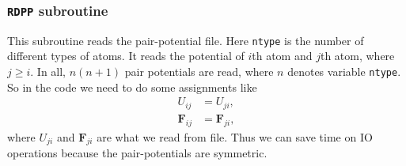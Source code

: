 
\subsubsection{\texttt{RDPP} subroutine}

This subroutine reads the pair-potential file.
Here \texttt{ntype} is the number of different types of atoms.
It reads the potential of $i$th atom and $j$th atom, where $j \geq i$.
In all, $n (n+1)$ pair potentials are read, where $n$ denotes variable \texttt{ntype}.
So in the code we need to do some assignments like
\begin{align}
	U_{ij}      & = U_{ji},      \\
	\bm{F}_{ij} & = \bm{F}_{ji},
\end{align}
where $U_{ji}$ and $\bm{F}_{ji}$ are what we read from file.
Thus we can save time on IO operations because the pair-potentials are symmetric.
